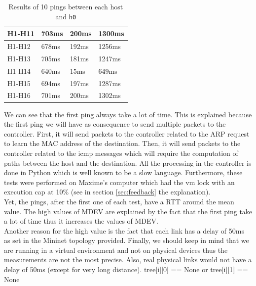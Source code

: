 \documentclass[a4paper, 11pt, oneside]{article}
\begin{document}
\begin{table}[H]
\begin{tabular}{|l|l|l|l|}
H1-H11                                     & 703ms                              & 200ms                              & 1300ms                                 \\ \hline
H1-H12                                     & 678ms                              & 192ms                              & 1256ms                                 \\ \hline
H1-H13                                     & 705ms                              & 181ms                              & 1247ms                                 \\ \hline
H1-H14                                     & 640ms                              & 15ms                              & 649ms                                 \\ \hline
H1-H15                                     & 694ms                              & 197ms                              & 1287ms                                 \\ \hline
H1-H16                                     & 701ms                              & 200ms                              & 1302ms                                 \\ \hline
\end{tabular}
\caption{Results of 10 pings between each host and \texttt{h0}}
\label{table:STCPings}
\end{table}
We can see that the first ping always take a lot of time. This is explained because the first ping we will have as consequence to send multiple packets to the controller. First, it will send packets to the controller related to the ARP request to learn the MAC address of the destination. Then, it will send packets to the controller related to the icmp messages which will require the computation of paths between the host and the destination. All the processing in the controller is done in Python which is well known to be a slow language. Furthermore, these tests were performed on Maxime's computer which had the vm lock with an execution cap at 10\% (see in section \ref{sec:feedback} the explanation).\\
Yet, the pings, after the first one of each test, have a RTT around the mean value. The high values of MDEV are explained by the fact that the first ping take a lot of time thus it increases the values of MDEV.\\
Another reason for the high value is the fact that each link has a delay of 50ms as set in the Mininet topology provided. Finally, we should keep in mind that we are running in a virtual environment and not on physical devices thus the measurements are not the most precise. Also, real physical links would not have a delay of 50ms (except for very long distance).
tree[i][0] == None or tree[i][1] == None
\end{document}

